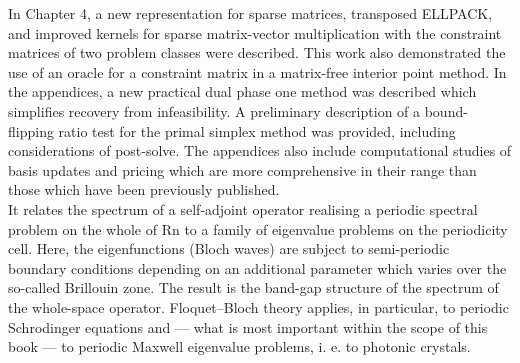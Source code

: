 In Chapter 4, a new representation for sparse matrices, transposed ELLPACK, and improved kernels for sparse matrix-vector multiplication with the constraint matrices of two problem classes were described. This work also demonstrated the use of an oracle for a constraint matrix in a matrix-free interior point method. In the appendices, a new practical dual phase one method was described which simplifies recovery from infeasibility. A preliminary description of a bound-flipping ratio test for the primal simplex method was provided, including considerations of post-solve. The appendices also include computational studies of basis updates and pricing which are more comprehensive in their range than those which have been previously published.
~\\
	
It relates the spectrum of a self-adjoint operator realising a periodic spectral problem on the whole of Rn to a family of eigenvalue problems on the periodicity cell. Here, the eigenfunctions (Bloch waves) are subject to semi-periodic boundary conditions depending on an additional parameter which varies over the so-called Brillouin zone. The result is the band-gap structure of the spectrum of the whole-space operator. Floquet–Bloch theory applies, in particular, to periodic Schrodinger equations and — what is most important within the scope of this book — to periodic Maxwell eigenvalue problems, i. e. to photonic crystals.
~\\

